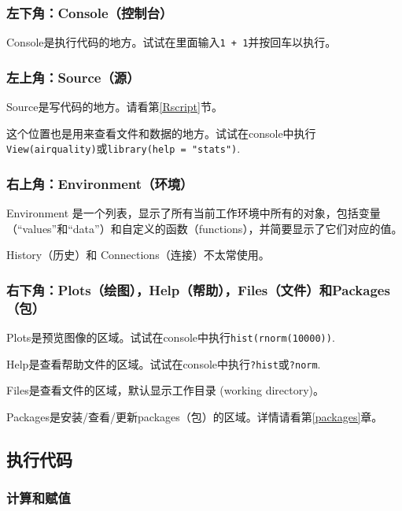 \documentclass[]{book}
\begin{document}
\hypertarget{console}{%
\subsubsection{左下角：Console（控制台）}\label{console}}

Console是执行代码的地方。试试在里面输入\texttt{1\ +\ 1}并按回车以执行。

\hypertarget{source}{%
\subsubsection{左上角：Source（源）}\label{source}}

Source是写代码的地方。请看第\ref{Rscript}节。

这个位置也是用来查看文件和数据的地方。试试在console中执行\texttt{View(airquality)}或\texttt{library(help\ =\ "stats")}.

\hypertarget{environment}{%
\subsubsection{右上角：Environment（环境）}\label{environment}}

Environment 是一个列表，显示了所有当前工作环境中所有的对象，包括变量（``values''和``data''）和自定义的函数（functions），并简要显示了它们对应的值。

History（历史）和 Connections（连接）不太常使用。

\hypertarget{bottomright}{%
\subsubsection{右下角：Plots（绘图），Help（帮助），Files（文件）和Packages（包）}\label{bottomright}}

Plots是预览图像的区域。试试在console中执行\texttt{hist(rnorm(10000))}.

Help是查看帮助文件的区域。试试在console中执行\texttt{?hist}或\texttt{?norm}.

Files是查看文件的区域，默认显示工作目录 (working directory)。

Packages是安装/查看/更新packages（包）的区域。详情请看第\ref{packages}章。

\hypertarget{execution}{%
\subsection{执行代码}\label{execution}}

\subsubsection{计算和赋值}
\end{document}
